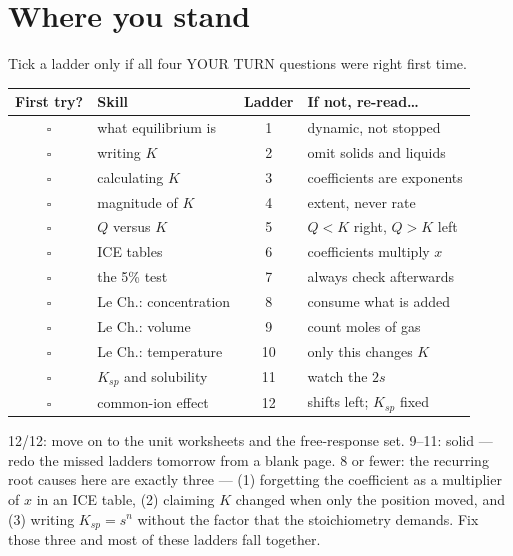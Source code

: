 \documentclass{apchem-worksheet}
\begin{document}
\section*{\sffamily Where you stand}

Tick a ladder only if all four YOUR TURN questions were right first time.

\renewcommand{\arraystretch}{1.30}
\noindent\begin{tabular}{@{}c p{6.0cm} c >{\raggedright\arraybackslash}p{4.9cm}@{}}
\toprule
\textbf{First try?} & \textbf{Skill} & \textbf{Ladder} &
  \textbf{If not, re-read\ldots}\\
\midrule
$\square$ & what equilibrium is & 1 & dynamic, not stopped \\
$\square$ & writing $K$ & 2 & omit solids and liquids \\
$\square$ & calculating $K$ & 3 & coefficients are exponents \\
$\square$ & magnitude of $K$ & 4 & extent, never rate \\
$\square$ & $Q$ versus $K$ & 5 & $Q<K$ right, $Q>K$ left \\
$\square$ & ICE tables & 6 & coefficients multiply $x$ \\
$\square$ & the 5\% test & 7 & always check afterwards \\
$\square$ & Le Ch.: concentration & 8 & consume what is added \\
$\square$ & Le Ch.: volume & 9 & count moles of gas \\
$\square$ & Le Ch.: temperature & 10 & only this changes $K$ \\
$\square$ & $K_{sp}$ and solubility & 11 & watch the $2s$ \\
$\square$ & common-ion effect & 12 & shifts left; $K_{sp}$ fixed \\
\bottomrule
\end{tabular}

\begin{apcnote}
12/12: move on to the unit worksheets and the free-response set.
9--11: solid --- redo the missed ladders tomorrow from a blank page.
8 or fewer: the recurring root causes here are exactly three ---
(1) forgetting the coefficient as a multiplier of $x$ in an ICE table,
(2) claiming $K$ changed when only the position moved, and (3) writing
$K_{sp} = s^n$ without the factor that the stoichiometry demands. Fix
those three and most of these ladders fall together.
\end{apcnote}
\end{document}
